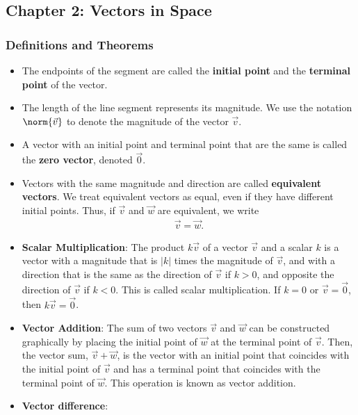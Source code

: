 \documentclass{report}
\begin{document}
    \pagebreak 
    \subsection{Chapter 2: Vectors in Space}

    \bigbreak \noindent 
    \subsubsection{Definitions and Theorems}
    \begin{itemize}
        \item The endpoints of the segment are called the \textbf{initial point} and the \textbf{terminal point} of the vector.
        \item The length of the line segment represents its magnitude. We use the notation  $\norm{\vec{v}}$ to denote the magnitude of the vector  $\vec{v}$.
        \item A vector with an initial point and terminal point that are the same is called the \textbf{zero vector}, denoted $\vec{0}$.
        \item Vectors with the same magnitude and direction are called \textbf{equivalent vectors}. We treat equivalent vectors as equal, even if they have different initial points. Thus, if  $\vec{v}$ and  $\vec{w}$ are equivalent, we write
      \begin{align*}
         \vec{v} = \vec{w} 
      .\end{align*}
  \item \textbf{Scalar Multiplication}:
      The product $k\vec{v}$ of a vector $\vec{v}$ and a scalar $k$ is a vector with a magnitude that is $|k|$ times the magnitude of $\vec{v}$, and with a direction that is the same as the direction of $\vec{v}$ if $k > 0$, and opposite the direction of $\vec{v}$ if $k < 0$. This is called scalar multiplication. If $k = 0$ or $\vec{v} = \vec{0}$, then $k\vec{v} = \vec{0}$.
    \item \textbf{Vector Addition}: 
        The sum of two vectors $\vec{v}$ and $\vec{w}$ can be constructed graphically by placing the initial point of $\vec{w}$ at the terminal point of $\vec{v}$. Then, the vector sum, $\vec{v} + \vec{w}$, is the vector with an initial point that coincides with the initial point of $\vec{v}$ and has a terminal point that coincides with the terminal point of $\vec{w}$. This operation is known as vector addition.
        \bigbreak \noindent 
    \item \textbf{Vector difference}: 

\end{itemize}
\end{document}
